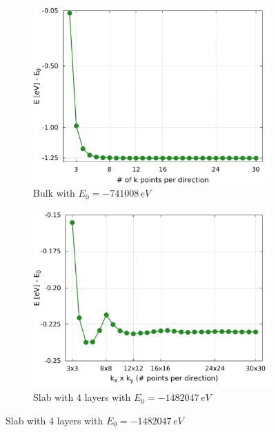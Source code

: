 \begin{figure}[b!]
	\begin{subfigure}[c]{.5\linewidth}
		\centering
		\includegraphics[width=\linewidth]{andere_bilder/kgrid_bulk.pdf}
		\caption{Bulk with $E_0= -741008 \,\unit{eV}$} \label{k_grid_1}
		\vspace{5pt}
	\end{subfigure}
	\hfill
	\begin{subfigure}[c]{.5\linewidth}
		\centering
		\includegraphics[width=\linewidth]{andere_bilder/kgrid_1x1x4_layers.pdf}
		\caption{Slab with 4 layers with $E_0= -1482047 \,\unit{eV}$} \label{k_grid_2}
		\vspace{5pt}
	\end{subfigure}

\end{figure}
